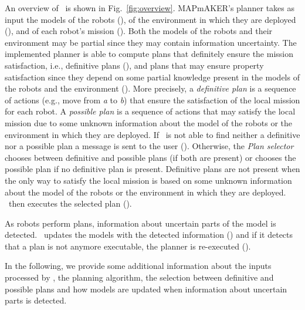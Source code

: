 
An overview of \toolName\ is shown in Fig.~\ref{fig:overview}.
MAPmAKER's planner takes as input the models of the robots (), of the environment in which they are deployed (), and of each robot's mission ().
Both the models of the robots and their environment may be partial since they may contain information uncertainty.
The implemented planner is able to compute plans that definitely ensure the mission satisfaction, i.e., definitive plans  (), and plans that may ensure property satisfaction since they depend on some partial knowledge present in the models of the robots and the environment  ().
More precisely, a \emph{definitive plan} is a sequence of actions (e.g., move from \emph{a} to \emph{b}) that ensure the satisfaction of the local mission for each robot. 
A \emph{possible plan} is a sequence of actions that may satisfy the local mission due to some unknown information about the model of the robots or the environment in which they are deployed. 
If \toolName\ is not able to find neither a definitive nor a possible plan a message is sent to the user ().
Otherwise, the \emph{Plan selector} chooses between definitive and possible plans (if both are present) or chooses the possible plan if no definitive plan is present.
Definitive plans are not present when the only way to satisfy the local mission is based on some unknown information about the model of the robots or the environment in which they are deployed. 
\toolName\ then executes the selected plan ().

As robots perform plans, information about uncertain parts of the model is detected.
\toolName\ updates the  models with the detected information () and if it detects that a plan is not anymore executable, the planner is re-executed ().


In the following, we provide some additional information about the inputs processed  by \toolName, the planning algorithm, the selection between definitive and possible plans and how models are updated when information about uncertain parts is detected.


